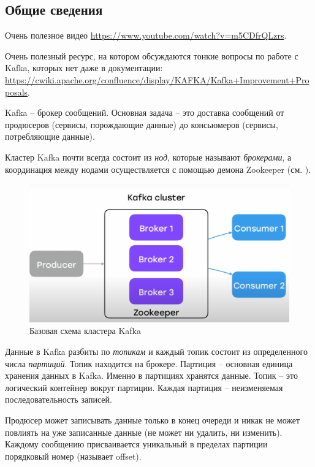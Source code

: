\documentclass[%
	11pt,
	a4paper,
	utf8,
		]{article}
\begin{document}
\subsection{Общие сведения}

Очень полезное видео \url{https://www.youtube.com/watch?v=m5CDfrQLzrs}.

Очень полезный ресурс, на котором обсуждаются тонкие вопросы по работе с Kafka, которых нет даже в документации: \url{https://cwiki.apache.org/confluence/display/KAFKA/Kafka+Improvement+Proposals}.

Kafka -- брокер сообщений. Основная задача -- это доставка сообщений от продюсеров (сервисы, порождающие данные) до консьюмеров (сервисы, потребляющие данные).

Кластер Kafka почти всегда состоит из \emph{нод}, которые называют \emph{брокерами}, а координация между нодами осуществляется с помощью демона Zookeeper (см. ).

\begin{figure}[h]
	\centering
	\includegraphics[scale=0.55]{figures/base_schema_kafka.png}
	\caption{ Базовая схема кластера Kafka }\label{fig:base_schema_kafka}
\end{figure}

Данные в Kafka разбиты по \emph{топикам} и каждый топик состоит из определенного числа \emph{партиций}. Топик находится на брокере. Партиция -- основная единица хранения данных в Kafka. Именно в партициях хранятся данные. Топик -- это логический контейнер вокруг партиции. Каждая партиция -- неизменяемая последовательность записей.

Продюсер может записывать данные только в конец очереди и никак не может повлиять на уже записанные данные (не может ни удалить, ни изменить). Каждому сообщению присваивается уникальный в пределах партиции порядковый номер (называет offset).
\end{document}
